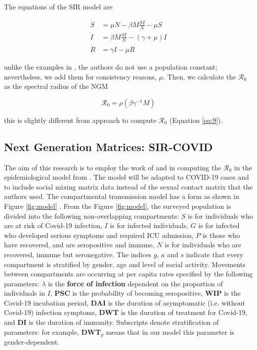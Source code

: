 \documentclass[12pt]{article}
\begin{document}
The equations of the SIR model are

\begin{align*}
\dot{S} & =  \mu N - \beta M\frac{SI}{N} - \mu S\\
\dot{I}  & =  \beta M\frac{SI}{N} - (\gamma + \mu) I  \\
\dot{R}  & =  \gamma I - \mu R
\end{align*}

unlike the examples in \cite{Diekmann:2010}, the authors do not use a population constant; nevertheless, we add them for consistency reasons, $\mu$. Then, we calculate the $\mathcal{R}_{0}$ as the spectral radius of the NGM 

\begin{equation}
\mathcal{R}_{0} = \rho(\beta\gamma^{-1}M)
\end{equation}

this is slightly different from \cite{Klepac2020} approach to compute $\mathcal{R}_{0}$ (Equation \ref{eq:9}). 

\subsection{Next Generation Matrices: SIR-COVID}
\label{sub:2.4}

The aim of this research is to employ the work of \cite{Diekmann:2010} and \cite{Fumanelli:2012} in computing the $\mathcal{R}_{0}$ in the epidemiological model from \cite{Gareth:2013}. The model will be adapted to COVID-19 cases and to include social mixing matrix data instead of the sexual contact matrix that the authors used. The compartmental transmission model has a form as shown in Figure \ref{fig:model} \cite[p.5]{Gareth:2013}. From the Figure \ref{fig:model}, the surveyed population is divided into the following non-overlapping compartments: $S$ is for individuals who are at risk of Covid-19 infection, $I$ is for infected individuals, $G$ is for infected who developed serious symptoms and required ICU admission, $P$ is those who have recovered, and are seropositive and immune, $N$ is for individuals who are recovered, immune but seronegative. The indices $g$, $a$ and $s$ indicate that every compartment is stratified by gender, age and level of social activity. Movements between compartments are occurring at per capita rates specified by the following parameters: $\lambda$ is the \textbf{force of infection} dependent on the proportion of individuals in $I$, \textbf{PSC} is the probability of becoming seropositive, \textbf{WIP} is the Covid-19 incubation period, \textbf{DAI} is the duration of asymptomatic (i.e. without Covid-19) infection symptoms, \textbf{DWT} is the duration of treatment for Covid-19, and \textbf{DI} is the duration of immunity. Subscripts denote stratification of parameters: for example, \textbf{DWT}$_{g}$ means that in our model this parameter is gender-dependent.
\end{document}
